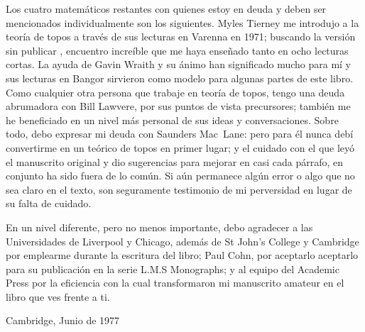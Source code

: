 Los cuatro matemáticos restantes con quienes estoy en deuda y deben ser
mencionados individualmente son los siguientes. Myles Tierney me introdujo a la
teoría de topos a través de sus lecturas en Varenna en 1971; buscando la versión
sin publicar \pend{[TV]}, encuentro increíble que me haya enseñado tanto en ocho
lecturas cortas. La ayuda de Gavin Wraith y su ánimo han significado mucho para
mí y sus lecturas en Bangor \pend{[WB]} sirvieron como modelo para algunas
partes de este libro. Como cualquier otra persona que trabaje en teoría de
topos, tengo una deuda abrumadora con Bill Lawvere, por sus puntos de vista
precursores; también me he beneficiado en un nivel más personal de sus ideas y
conversaciones. Sobre todo, debo expresar mi deuda con Saunders Mac~Lane: pero
para él nunca debí convertirme en un teórico de topos en primer lugar; y el
cuidado con el que leyó el manuscrito original y dio sugerencias para mejorar en
casi cada párrafo, en conjunto ha sido fuera de lo común. Si aún permanece algún
error o algo que no sea claro en el texto, son seguramente testimonio de mi
perversidad en lugar de su falta de cuidado.

En un nivel diferente, pero no menos importante, debo agradecer a las
Universidades de Liverpool y Chicago, además de St John's College y Cambridge
por emplearme durante la escritura del libro; Paul Cohn, por aceptarlo aceptarlo
para su publicación en la serie L.M.S Monographs; y al equipo del Academic Press
por la eficiencia con la cual transformaron mi manuscrito amateur en el libro
que ves frente a ti.

\vspace{3ex}

\noindent
Cambridge, Junio de 1977